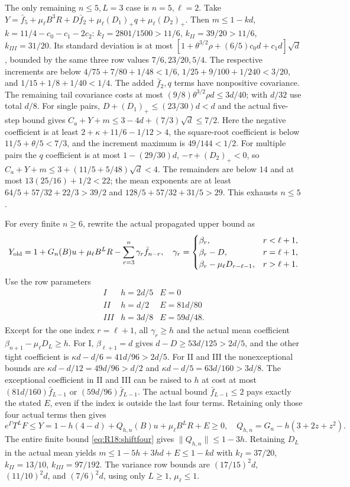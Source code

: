 The only remaining $n\le5,L=3$ case is $n=5,\ell=2$. Take
$Y=\bar f_5+\mu_\ell B^3R+D\bar f_2
+\mu_\ell(D_1)_+q+\mu_\ell(D_2)_+$.
Then $m\le1-kd$, $k=11/4-c_0-c_1-2c_2$:
$k_I=2801/1500>11/6$, $k_{II}=39/20>11/6$,
$k_{III}=31/20$.
Its standard deviation is at most
$[1+\theta^{3/2}\rho+(6/5)c_0d+c_1d]\sqrt d$, bounded by the
same three row values $7/6,23/20,5/4$.
The respective increments are below
$4/75+7/80+1/48<1/6$,
$1/25+9/100+1/240<3/20$, and
$1/15+1/8+1/40<1/4$.
The added $\bar f_2,q$ terms have nonpositive covariance.
The remaining tail covariance costs at most
$(9/8)\theta^{3/2}\rho d\le3d/40$; with $d/32$ use total $d/8$.
For single pairs, $D+(D_1)_+\le(23/30)d<d$ and the actual five-step
bound gives $C_a+Y+m\le3-4d+(7/3)\sqrt d\le7/2$.
Here the negative coefficient is at least
$2+\kappa+11/6-1/12>4$, the square-root coefficient is below
$11/5+\theta/5<7/3$, and the increment maximum is $49/144<1/2$.
For multiple pairs the $q$ coefficient is at most $1-(29/30)d$,
$-\tau+(D_2)_+<0$, so
$C_a+Y+m\le3+(11/5+5/48)\sqrt d<4$.
The remainders are below $14$ and at most
$13(25/16)+1/2<22$; the mean exponents are at least
$64/5+57/32+22/3>39/2$ and
$128/5+57/32+31/5>29$. This exhausts $n\le5$.

For every finite $n\ge6$, rewrite the actual propagated upper bound as
\[
Y_{\rm old}=1+G_n(B)u+\mu_\ell B^LR
-\sum_{r=3}^n\gamma_r\bar f_{n-r},
\quad
\gamma_r=\begin{cases}
\beta_r,&r<\ell+1,\\
\beta_r-D,&r=\ell+1,\\
\beta_r-\mu_\ell D_{r-\ell-1},&r>\ell+1.
\end{cases}
\]
Use the row parameters
\[
\begin{array}{c|cc}I&h=2d/5&E=0\\
II&h=d/2&E=81d/80\\III&h=3d/8&E=59d/48.\end{array}
\]
Except for the one index $r=\ell+1$, all $\gamma_r\ge h$ and
the actual mean coefficient $\beta_{n+1}-\mu_\ell D_L\ge h$.
For I, $\beta_{\ell+1}=d$ gives
$d-D\ge53d/125>2d/5$, and the other tight coefficient is
$\kappa d-d/6=41d/96>2d/5$.
For II and III the nonexceptional bounds are
$\kappa d-d/12=49d/96>d/2$ and
$\kappa d-d/5=63d/160>3d/8$.
The exceptional coefficient in II and III can be raised to $h$ at
cost at most $(81d/160)\bar f_{L-1}$ or
$(59d/96)\bar f_{L-1}$. The actual bound $\bar f_{L-1}\le2$ pays
exactly the stated $E$, even if the index is outside the last four terms.
Retaining only those four actual terms then gives
\begin{equation}\tag{R20.8.1}\label{eq:R20:long}
e^\Gamma T^LF\le Y=1-h(4-d)+Q_{h,n}(B)u+\mu_\ell B^LR+E\ge0,
\quad Q_{h,n}=G_n-h(3+2z+z^2).
\end{equation}
The entire finite bound \eqref{eq:R18:shiftfour} gives
$\|Q_{h,n}\|\le1-3h$. Retaining $D_L$ in the actual mean yields
$m\le1-5h+3hd+E\le1-kd$ with
$k_I=37/20$, $k_{II}=13/10$, $k_{III}=97/192$.
The variance row bounds are $(17/15)^2d$, $(11/10)^2d$,
and $(7/6)^2d$, using only $L\ge1$, $\mu_\ell\le1$.

